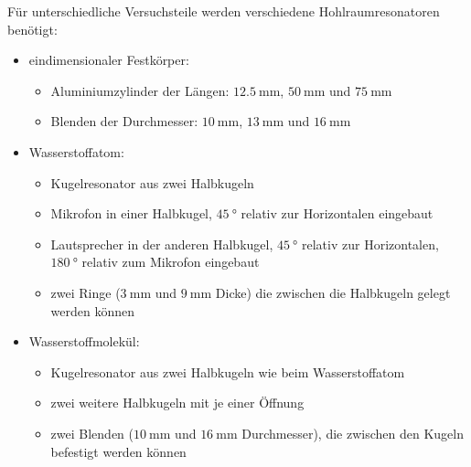 \newpage
Für unterschiedliche Versuchsteile werden verschiedene Hohlraumresonatoren benötigt:
\begin{itemize}
    \item eindimensionaler Festkörper:
        \begin{itemize}
            \item Aluminiumzylinder der Längen: $\SI{12,5}{\milli\meter}$, $\SI{50}{\milli\meter}$ und $\SI{75}{\milli\meter}$
            \item Blenden der Durchmesser: $\SI{10}{\milli\meter}$, $\SI{13}{\milli\meter}$ und $\SI{16}{\milli\meter}$
        \end{itemize}
    \item Wasserstoffatom:
        \begin{itemize}
            \item Kugelresonator aus zwei Halbkugeln
            \item Mikrofon in einer Halbkugel, $\SI{45}{\degree}$ relativ zur Horizontalen eingebaut
            \item Lautsprecher in der anderen Halbkugel, $\SI{45}{\degree}$ relativ zur Horizontalen, $\SI{180}{\degree}$ relativ zum Mikrofon eingebaut
            \item zwei Ringe ($\SI{3}{\milli\meter}$ und $\SI{9}{\milli\meter}$ Dicke) die zwischen die Halbkugeln gelegt werden können
        \end{itemize}
    \item Wasserstoffmolekül:
        \begin{itemize}
            \item Kugelresonator aus zwei Halbkugeln wie beim Wasserstoffatom
            \item zwei weitere Halbkugeln mit je einer Öffnung
            \item zwei Blenden ($\SI{10}{\milli\meter}$ und $\SI{16}{\milli\meter}$ Durchmesser), die zwischen den Kugeln befestigt werden können
        \end{itemize}
\end{itemize}

